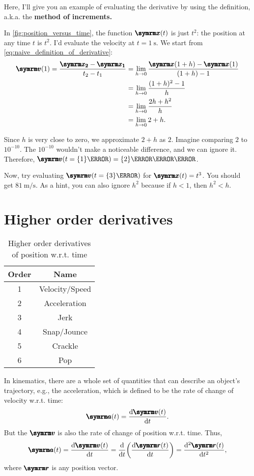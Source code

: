 Here, I'll give you an example of evaluating the derivative by using the definition, a.k.a. the \textbf{method of increments.}

In \cref{fig:position_versus_time}, the function $\vv{x}(t)$ is just $t^2$: the position at any time $t$ is $t^2$. I'd evaluate the velocity at $t = \qty{1}{\second}$. We start from \cref{eq:naive_definition_of_derivative}:
\begin{align*}
    \vv{v}(1) = \frac{\vv{x_2} - \vv{x_1}}{t_2 - t_1} &= \lim_{h \appr 0}\frac{\vv{x}(1 + h) - \vv{x}(1)}{(1 + h) - 1} \\
    &= \lim_{h \appr 0}\frac{(1 + h)^2 - 1}{h} \\
    &= \lim_{h \appr 0}\frac{2h + h^2}{h} \\
    &= \lim_{h \appr 0}2 + h.
\end{align*}

Since $h$ is very close to zero, we approximate $2 + h$ as $2$. Imagine comparing $2$ to $10^{-10}$. The $10^{-10}$ wouldn't make a noticeable difference, and we can ignore it. Therefore, $\vv{v}(t = \qty{1}{\second}) = \qty{2}{\meter\per\second}$.

Now, try evaluating $\vv{v}(t = \qty{3}{\second})$ for $\vv{x}(t) = t^3$. You should get $\qty{81}{\meter\per\second}$. As a hint, you can also ignore $h^2$ because if $h < 1$, then $h^2 < h$.

\section{Higher order derivatives}

\begin{wraptable}[13]{l}{0.35\textwidth}
    \begin{tabular}{c | c}
        Order & Name \\
        \hline
        1 & Velocity/Speed \\
        2 & Acceleration \\
        3 & Jerk \\
        4 & Snap/Jounce \\
        5 & Crackle \\
        6 & Pop
    \end{tabular}
    \caption{Higher order derivatives of position w.r.t. time}
    \label{tab:jerksnapcracklepop}
\end{wraptable}

In kinematics, there are a whole set of quantities that can describe an object's trajectory, e.g., the acceleration, which is defined to be the rate of change of velocity w.r.t. time:
\begin{equation*}
    \vv{a}(t) = \dv{\vv{v}(t)}{t}.
\end{equation*}
But the $\vv{v}$ is also the rate of change of position w.r.t. time. Thus,
\begin{equation*}
    \vv{a}(t) = \dv{\vv{v}(t)}{t} = \dv{t}(\dv{\vv{r}(t)}{t}) = \dv[2]{\vv{r}(t)}{t}, 
\end{equation*}
where $\vv{r}$ is any position vector.

